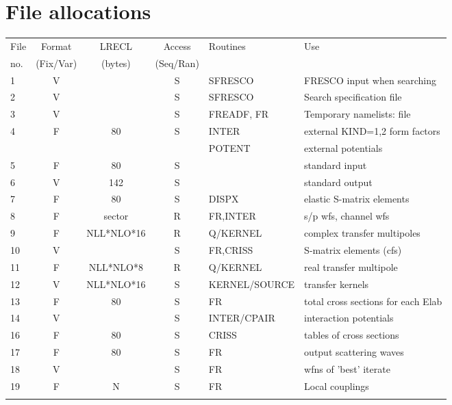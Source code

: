 \documentclass[11pt]{article}
\begin{document}
\section{File allocations}
\label{files}
{\small 
\begin{tabular}{|l | c c c | l | l|}
\hline
File & Format & LRECL  & Access & Routines & Use \\
 no. & (Fix/Var) & (bytes) & (Seq/Ran) &  &  \\
\hline
1    &  V &             & S  &     SFRESCO& FRESCO input when searching\\
2    &  V &             & S  &     SFRESCO& Search specification file\\
3    &  V &             & S  &     FREADF, FR& Temporary namelists: file\\
4    &  F &     80      & S  &     INTER & external KIND=1,2 form factors\\
     &    &             &    &     POTENT &external potentials\\
5    &  F &     80      & S  &         &   standard input\\
6    &  V &    142      & S  &          &  standard output\\
7    &  F &     80      & S  &     DISPX & elastic S-matrix elements\\
8 &  F &   sector    & R  &     FR,INTER & s/p wfs, channel wfs\\
9 &  F &  NLL*NLO*16    & R& Q/KERNEL &  complex transfer multipoles\\
10 &  V &             & S  &     FR,CRISS & S-matrix elements (cfs)\\
11 &  F & NLL*NLO*8 &  R & Q/KERNEL &  real transfer multipole\\
12 &  V &NLL*NLO*16 & S  &   KERNEL/SOURCE&transfer kernels\\
13    &  F &    80      & S  &      FR   &    total cross sections for each Elab\\
14  & V &             & S  &   INTER/CPAIR &interaction potentials\\
16    &  F &     80      & S  &       CRISS &  tables of cross sections\\
17    &  F &     80      & S  &       FR  &    output scattering waves\\
18 &  V &             & S  &       FR  &    wfns of 'best' iterate\\
19    &  F &    N      & S  &     FR  &   Local couplings\\
     &  & & & &\\

\end{tabular}}
\end{document}
